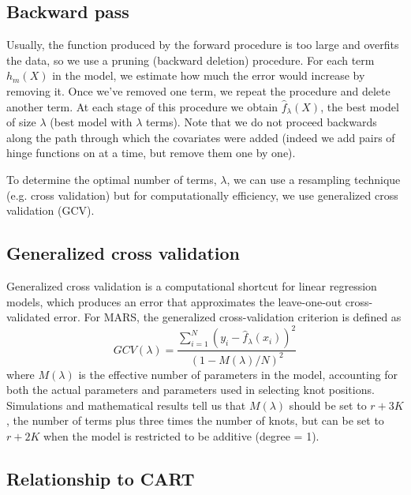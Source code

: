 \documentclass[12pt]{article}
\begin{document}
\subsection{Backward pass} %
\label{sub:backward_pass}

Usually, the function produced by the forward procedure is too large and overfits the data, so we use a pruning (backward deletion) procedure. For each term $h_{m}(X)$ in the model, we estimate how much the error would increase by removing it. Once we've removed one term, we repeat the procedure and delete another term. At each stage of this procedure we obtain $\hat{f}_{\lambda}(X)$, the best model of size $\lambda$ (best model with $\lambda$ terms). Note that we do not proceed backwards along the path through which the covariates were added (indeed we add pairs of hinge functions on at a time, but remove them one by one). 

To determine the optimal number of terms, $\lambda$, we can use a resampling technique (e.g. cross validation) but for computationally efficiency, we use generalized cross validation (GCV).


\subsection{Generalized cross validation} %
\label{sub:generalized_cross_validation}

Generalized cross validation is a computational shortcut for linear regression models, which produces an error that approximates the leave-one-out cross-validated error. For MARS, the generalized cross-validation criterion is defined as
\begin{equation}
  GCV(\lambda) = 
    \frac{
      \sum_{i = 1}^{N}(y_{i} - \hat{f}_{\lambda}(x_{i}))^2
    }{
      (1 - M(\lambda)/N)^2
    }
\end{equation}
where $M(\lambda)$ is the effective number of parameters in the model, accounting for both the actual parameters and parameters used in selecting knot positions. Simulations and mathematical results tell us that $M(\lambda)$ should be set to $r + 3K$, the number of terms plus three times the number of knots, but can be set to $r + 2K$ when the model is restricted to be additive (degree = 1).


\subsection{Relationship to CART} %
\label{sub:relationship_to_cart}
\end{document}
